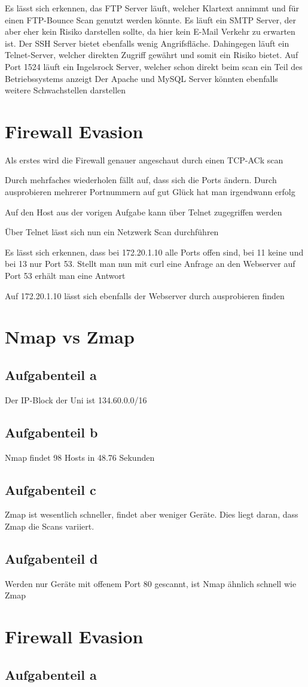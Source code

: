\documentclass[a4paper,12pt,
headsepline,           %
twoside,               %
pointlessnumbers,      %
bibtotoc,              %
BCOR15mm               %
]{scrbook}
\begin{document}
Es lässt sich erkennen, das FTP Server läuft, welcher Klartext annimmt und für einen FTP-Bounce Scan genutzt werden könnte. Es läuft ein SMTP Server, der aber eher kein Risiko darstellen sollte, da hier kein E-Mail Verkehr zu erwarten ist. Der SSH Server bietet ebenfalls wenig Angrifsfläche. Dahingegen läuft
ein Telnet-Server, welcher direkten Zugriff gewährt und somit ein Risiko bietet. Auf Port 1524 läuft ein Ingelsrock Server, welcher schon direkt beim scan ein Teil des Betriebssystems anzeigt
Der Apache und MySQL Server könnten ebenfalls weitere Schwachstellen darstellen

\section*{Firewall Evasion}
Als erstes wird die Firewall genauer angeschaut durch einen TCP-ACk scan

Durch mehrfaches wiederholen fällt auf, dass sich die Ports ändern. Durch ausprobieren mehrerer Portnummern auf gut Glück hat man irgendwann erfolg

Auf den Host aus der vorigen Aufgabe kann über Telnet zugegriffen werden

Über Telnet lässt sich nun ein Netzwerk Scan durchführen

Es lässt sich erkennen, dass bei 172.20.1.10 alle Ports offen sind, bei 11 keine und bei 13 nur Port 53. Stellt man nun mit curl eine Anfrage an den Webserver auf Port 53 erhält man eine Antwort

Auf 172.20.1.10 lässt sich ebenfalls der Webserver durch ausprobieren finden


\section*{Nmap vs Zmap}
\subsection*{Aufgabenteil a}
Der IP-Block der Uni ist 134.60.0.0/16
\subsection*{Aufgabenteil b}

Nmap findet 98 Hosts in 48.76 Sekunden
\subsection*{Aufgabenteil c}

Zmap ist wesentlich schneller, findet aber weniger Geräte. Dies liegt daran, dass Zmap die Scans variiert.
\subsection*{Aufgabenteil d}

Werden nur Geräte mit offenem Port 80 gescannt, ist Nmap ähnlich schnell wie Zmap

\section*{Firewall Evasion}
\subsection*{Aufgabenteil a}
\end{document}
